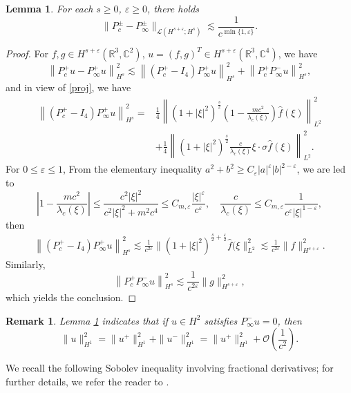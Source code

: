 \documentclass{amsart}
\theoremstyle{plain}
\newtheorem{lemma}[theorem]{Lemma}
\newtheorem{remark}[theorem]{Remark}
\theoremstyle{definition}
\theoremstyle{remark}
\numberwithin{equation}{section} \numberwithin{figure}{section}
\begin{document}
\begin{lemma}\label{nar}
For each $s\geq 0$, $\varepsilon\geqslant0$, there holds 
$$
      \|P_c^\pm - P_\infty^\pm\|_{\mathcal{L}(H^{s+\varepsilon}; H^{s})} \lesssim \frac{1}{c^{\min\{1, \varepsilon\}}}.
      $$
\end{lemma}
\begin{proof}
     For $f,g\in H^{s+\varepsilon}(\mathbb{R}^3, \mathbb{C}^2)$,
     $u=(f, g)^T\in H^{s+\varepsilon}(\mathbb{R}^3, \mathbb{C}^4)$, we have
    \begin{equation}
            \left\|P_c^+ u - P_\infty^+u \right\|_{H^s}^2\lesssim
            \left\|(P_c^+ - I_4)P_\infty^+ u\right\|_{H^s}^2
            +
            \left\|P_c^+ P_\infty^- u\right\|_{H^s}^2,
    \end{equation}
    and in view of \eqref{proj}, we have
    \begin{equation}
        \begin{split}
             \left\|(P_c^+ - I_4) P_\infty^+ u\right\|_{H^s}^2
             =&\frac{1}{4}\left\| (1+|\xi|^2)^{\frac{s}{2}}\left(1-\frac{mc^{2}}{\lambda_c(\xi)}\right)\hat{f}(\xi)\right\|_{L^{2}}^{2}\\
             &+\frac{1}{4}\left\|(1+|\xi|^2)^{\frac{s}{2}}\frac{c}{\lambda_c(\xi)}\xi\cdot\sigma\hat{f}(\xi)\right\|_{L^{2}}^{2}.
        \end{split}
    \end{equation}
  For $0\leq \varepsilon\leq 1$,  From the elementary inequality $a^2 + b^2\geqslant
    C_\varepsilon|a|^\varepsilon|b|^{2-\varepsilon}$, we are led to
$$ |1-\frac{mc^2}{\lambda_c(\xi)}|\leq \frac{c^2|\xi|^2}{c^2|\xi|^2+ m^2c^4}\leq   C  _{m, \varepsilon} \frac{|\xi|^\varepsilon}{c^\varepsilon},\quad\frac{c}{\lambda_c(\xi)}\leq   C  _{m,\varepsilon} \frac{1}{{c^\varepsilon|\xi|^{1-\varepsilon}}},$$ then
\begin{equation}
    \begin{split}
         \left\|(P_c^+ - I_4) P_\infty^+ u\right\|_{H^s}^2\lesssim
         \frac{1}{c^{2\varepsilon}}\| (1+|\xi|^2)^{\frac{s}{2}+\frac{\varepsilon}{2}} \hat{f}(\xi\|_{L^2}^2\lesssim
         \frac{1}{c^{2\varepsilon}} \|f\|_{H^{s+\varepsilon}}^2.
    \end{split}
\end{equation}
Similarly, 
$$
\left\|P_c^+ P_\infty^- u\right\|_{H^s}^2\lesssim\frac{1}{c^{2\varepsilon}} \|g\|_{H^{s+\varepsilon}}^2,
$$
which yields the conclusion.
    \end{proof}
 \begin{remark}
Lemma \ref{nar} indicates that if \( u \in H^2 \) satisfies \( P_{\infty}^{-}u = 0 \), then
\begin{equation}\label{rem_stb}
    \|u\|_{H^1}^2 = \|u^+\|_{H^1}^2 + \|u^-\|_{H^1}^2 = \|u^+\|_{H^1}^2 + \mathcal{O}\left(\frac{1}{c^2}\right).
\end{equation}
 \end{remark}
%
%
We recall the following Sobolev inequality involving fractional derivatives; for further details, we refer the reader to \cite{MR1947703}.
\end{document}
